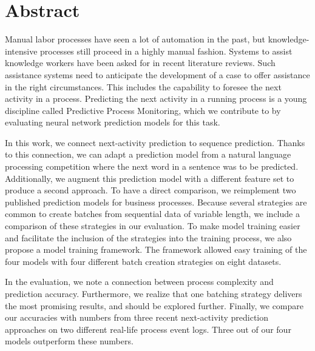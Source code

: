 


\begingroup
\let\clearpage\relax
\let\cleardoublepage\relax
\let\cleardoublepage\relax

\chapter*{Abstract}
Manual labor processes have seen a lot of automation in the past, but knowledge-intensive processes still proceed in a highly manual fashion.
Systems to assist knowledge workers have been asked for in recent literature reviews.
Such assistance systems need to anticipate the development of a case to offer assistance in the right circumstances.
This includes the capability to foresee the next activity in a process.
Predicting the next activity in a running process is a young discipline called Predictive Process Monitoring, which we contribute to by evaluating neural network prediction models for this task.

In this work, we connect next-activity prediction to sequence prediction.
Thanks to this connection, we can adapt a prediction model from a natural language processing competition where the next word in a sentence was to be predicted.
Additionally, we augment this prediction model with a different feature set to produce a second approach.
To have a direct comparison, we reimplement two published prediction models for business processes.
Because several strategies are common to create batches from sequential data of variable length, we include a comparison of these strategies in our evaluation.
To make model training easier and facilitate the inclusion of the strategies into the training process, we also propose a model training framework.
The framework allowed easy training of the four models with four different batch creation strategies on eight datasets.

In the evaluation, we note a connection between process complexity and prediction accuracy.
Furthermore, we realize that one batching strategy delivers the most promising results, and should be explored further.
Finally, we compare our accuracies with numbers from three recent next-activity prediction approaches on two different real-life process event logs.
Three out of our four models outperform these numbers.
\newpage
{}
